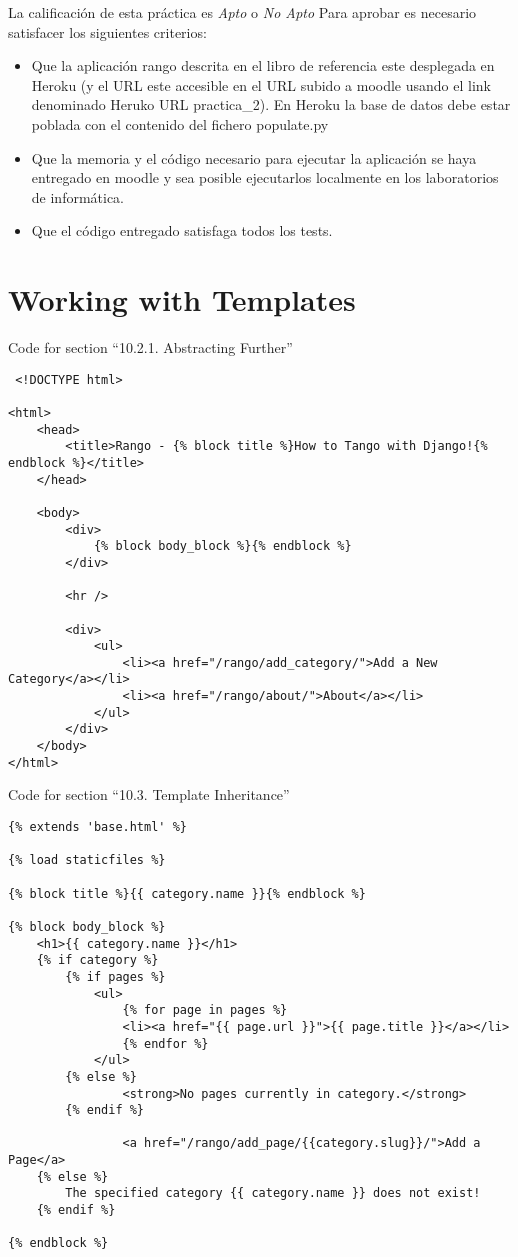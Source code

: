 \documentclass[12pt]{article} %
\begin{document}
La calificación de esta práctica es \textit{Apto} o \textit{No Apto}
Para aprobar es necesario satisfacer los siguientes criterios:
\begin{itemize}
 \item Que la aplicación rango descrita en el libro de referencia este desplegada en Heroku (y el URL este accesible en el URL subido a moodle usando el link denominado Heruko URL practica\_2). En Heroku  la base de datos debe estar poblada con el contenido del fichero populate.py
 \item Que la memoria y el código necesario para ejecutar la aplicación se haya entregado en moodle y  sea posible ejecutarlos localmente en los laboratorios de informática.
 \item Que el código entregado satisfaga todos los tests.
\end{itemize}

\newpage
\appendix

\section{Working with Templates}
\label{app:workingWithTemplates}
Code for section ``10.2.1. Abstracting Further''

\begin{verbatim}
 <!DOCTYPE html>

<html>
    <head>
        <title>Rango - {% block title %}How to Tango with Django!{% endblock %}</title>
    </head>

    <body>
        <div>
            {% block body_block %}{% endblock %}
        </div>

        <hr />

        <div>
            <ul>
                <li><a href="/rango/add_category/">Add a New Category</a></li>
                <li><a href="/rango/about/">About</a></li>
            </ul>
        </div>
    </body>
</html>
\end{verbatim}

Code for section ``10.3. Template Inheritance''

\begin{verbatim}
{% extends 'base.html' %}

{% load staticfiles %}

{% block title %}{{ category.name }}{% endblock %}

{% block body_block %}
    <h1>{{ category.name }}</h1>
    {% if category %}
        {% if pages %}
            <ul>
                {% for page in pages %}
                <li><a href="{{ page.url }}">{{ page.title }}</a></li>
                {% endfor %}
            </ul>
        {% else %}
                <strong>No pages currently in category.</strong>
        {% endif %}

                <a href="/rango/add_page/{{category.slug}}/">Add a Page</a>
    {% else %}
        The specified category {{ category.name }} does not exist!
    {% endif %}

{% endblock %}
\end{verbatim}
\end{document}
